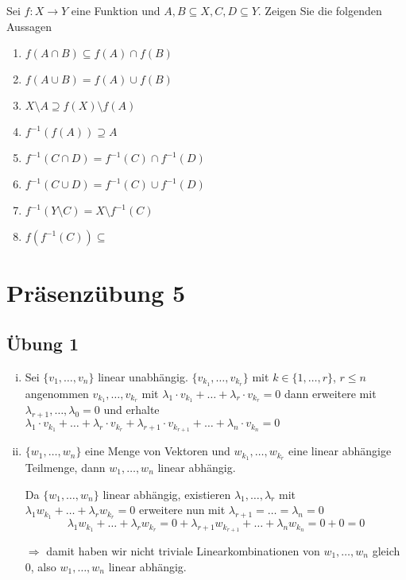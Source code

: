 \documentclass{article}
\begin{document}
Sei $f \colon X \to Y$ eine Funktion und $A, B \subseteq X, C, D \subseteq Y$. Zeigen Sie die folgenden Aussagen

\begin{enumerate}
\item $f(A \cap B) \subseteq f(A) \cap f(B)$
\item $f(A \cup B) = f(A) \cup f(B)$
\item $X \setminus A \supseteq f(X) \setminus f(A)$
\item $f^{-1}(f(A)) \supseteq A$
\item $f^{-1}(C \cap D) = f^{-1}(C) \cap f^{-1}(D)$
\item $f^{-1}(C \cup D) = f^{-1}(C) \cup f^{-1}(D)$
\item $f^{-1}(Y \setminus C) = X \setminus f^{-1}(C)$
\item $f(f^{-1}(C)) \subseteq $
\end{enumerate}

\newpage

\section*{Präsenzübung 5}

\subsection*{Übung 1}

\begin{enumerate}[(i)]
\item
  Sei $\{ v_1, \ldots, v_n \}$ linear unabhängig.
  $\{ v_{k_1}, \ldots, v_{k_r}\}$ mit $k \in \{ 1, \ldots, r \}$, $r \leq n$
  angenommen $v_{k_1}, \ldots, v_{k_r}$ mit $\lambda_1 \cdot v_{k_1} + \ldots + \lambda_r \cdot v_{k_r} = 0$
  dann erweitere mit $\lambda_{r+1}, \ldots, \lambda_0 = 0$ und erhalte
  $\lambda_1 \cdot v_{k_1} + \ldots + \lambda_r \cdot v_{k_r} + \lambda_{r+1} \cdot v_{k_{r+1}} + \ldots + \lambda_n \cdot v_{k_n} = 0$

\item
  $\{ w_1, \ldots, w_n\}$ eine Menge von Vektoren und $w_{k_1}, \ldots, w_{k_r}$ eine linear abhängige Teilmenge, dann
  $w_1, \ldots, w_n$ linear abhängig.

  Da $\{ w_1, \ldots, w_n\}$ linear abhängig, existieren $\lambda_1, \ldots, \lambda_r$ mit
  $\lambda_1 w_{k_1} + \ldots + \lambda_r w_{k_r} = 0$
  erweitere nun mit $\lambda_{r+1} = \ldots = \lambda_n = 0$
  \[
    \lambda_1 w_{k_1} + \ldots + \lambda_r w_{k_r} = 0 + \lambda_{r+1} w_{k_{r+1}} + \ldots + \lambda_n w_{k_n} = 0 + 0 = 0
  \]

  $\Rightarrow$ damit haben wir nicht triviale Linearkombinationen von $w_1, \ldots, w_n$ gleich $0$, also $w_1, \ldots, w_n$
  linear abhängig.
\end{enumerate}
\end{document}
